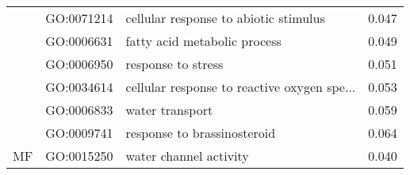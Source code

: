 \begin{longtable}{lllr}
   & GO:0071214 &        cellular response to abiotic stimulus &         0.047 \\
   & GO:0006631 &                 fatty acid metabolic process &         0.049 \\
   & GO:0006950 &                           response to stress &         0.051 \\
   & GO:0034614 &  cellular response to reactive oxygen spe... &         0.053 \\
   & GO:0006833 &                              water transport &         0.059 \\
   & GO:0009741 &                  response to brassinosteroid &         0.064 \\
\cline{1-4}
MF & GO:0015250 &                       water channel activity &         0.040 \\
\end{longtable}
